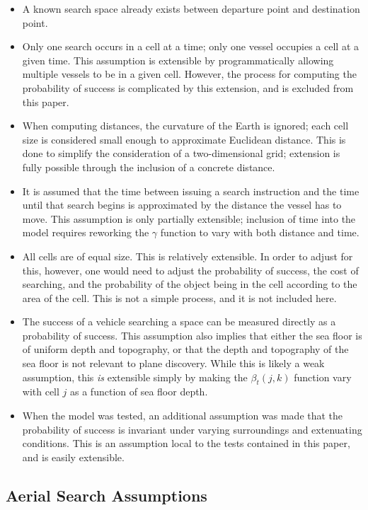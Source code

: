 \begin{itemize}
\item A known search space already exists between departure point and destination point.
\item Only one search occurs in a cell at a time; only one vessel occupies a cell at a given time. This assumption is extensible by programmatically allowing multiple vessels to be in a given cell. However, the process for computing the probability of success is complicated by this extension, and is excluded from this paper.
\item When computing distances, the curvature of the Earth is ignored; each cell size is considered small enough to approximate Euclidean distance. This is done to simplify the consideration of a two-dimensional grid; extension is fully possible through the inclusion of a concrete distance.  
\item It is assumed that the time between issuing a search instruction and the time until that search begins is approximated by the distance the vessel has to move. This assumption is only partially extensible; inclusion of time into the model requires reworking the $\gamma$ function to vary with both distance and time.
\item All cells are of equal size. This is relatively extensible. In order to adjust for this, however, one would need to adjust the probability of success, the cost of searching, and the probability of the object being in the cell according to the area of the cell. This is not a simple process, and it is not included here.
\item The success of a vehicle searching a space can be measured directly as a probability of success. This assumption also implies that either the sea floor is of uniform depth and topography, or that the depth and topography of the sea floor is not relevant to plane discovery. While this is likely a weak assumption, this \textit{is} extensible simply by making the $\beta_t(j,k)$ function vary with cell $j$ as a function of sea floor depth.

\item When the model was tested, an additional assumption was made that the probability of success is invariant under varying surroundings and extenuating conditions. This is an assumption local to the tests contained in this paper, and is easily extensible.
\end{itemize}

\subsection{Aerial Search Assumptions}

